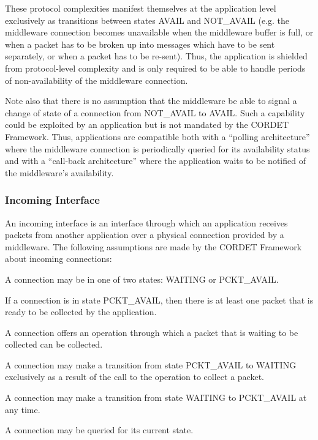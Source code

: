 These protocol complexities manifest themselves at the application level exclusively as transitions between states AVAIL and NOT\_AVAIL (e.g. the middleware connection  becomes unavailable when the middleware buffer is full, or when a packet has to be broken up into messages which have to be sent separately, or when a packet has to be re-sent). Thus, the application is shielded from protocol-level complexity and is only required to be able to handle periods of non-availability of the middleware connection.

Note also that there is no assumption that the middleware be able to signal a change of state of a connection from NOT\_AVAIL to AVAIL. Such a capability could be exploited by an application but is not mandated by the CORDET Framework. Thus, applications are compatible both with a “polling architecture” where the middleware connection is periodically queried for its availability status and with a “call-back architecture” where the application waits to be notified of the middleware's availability. 

\subsubsection{Incoming Interface}\label{sec:IncomingConnections}

An incoming interface is an interface through which an application receives packets from another application over a physical connection provided by a middleware. The following assumptions are made by the CORDET Framework about incoming connections:

\begin{fw_itemize}
\item[B1]{A connection may be in one of two states: WAITING or PCKT\_AVAIL.}
\item[B2]{If a connection is in state PCKT\_AVAIL, then there is at least one packet that is ready to be collected by the application.}
\item[B3]{A connection offers an operation through which a packet that is waiting to be collected can be collected.}
\item[B4]{A connection may make a transition from state PCKT\_AVAIL to WAITING exclusively as a result of the call to the operation to collect a packet.}
\item[B5]{A connection may make a transition from state WAITING to PCKT\_AVAIL at any time.}
\item[B6]{A connection may be queried for its current state.}
\end{fw_itemize}

